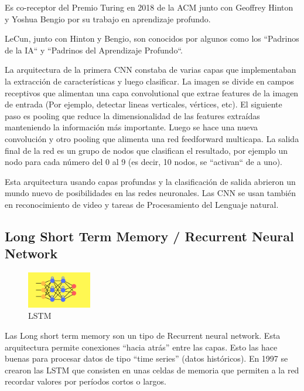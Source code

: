 \documentclass[a4paper]{article}
\begin{document}
Es co-receptor del Premio Turing en 2018 de la ACM junto con 
Geoffrey Hinton y Yoshua Bengio por su trabajo en aprendizaje 
profundo.

LeCun, junto con Hinton y Bengio, son conocidos por algunos como 
los ``Padrinos de la IA`` y ``Padrinos del Aprendizaje Profundo``. 



La arquitectura de la primera CNN constaba de varias capas que 
implementaban la extracción de características y luego clasificar. 
La imagen se divide en campos receptivos que alimentan una capa 
convolutional que extrae features de la imagen de entrada (Por 
ejemplo, detectar lineas verticales, vértices, etc). El siguiente 
paso es pooling que reduce la dimensionalidad de las features 
extraídas manteniendo la información más importante. Luego se hace 
una nueva convolución y otro pooling que alimenta una red 
feedforward multicapa. La salida final de la red es un grupo de 
nodos que clasifican el resultado, por ejemplo un nodo para cada 
número del 0 al 9 (es decir, 10 nodos, se ``activan`` de a uno).

Esta arquitectura usando capas profundas y la clasificación de 
salida abrieron un mundo nuevo de posibilidades en las redes 
neuronales. Las CNN se usan también en reconocimiento de video y 
tareas de Procesamiento del Lenguaje natural. 


\subsection{Long Short Term Memory / Recurrent Neural Network}
\begin{figure} %
    \centering
    \includegraphics[width=0.25\textwidth]{./images/net_lstm.png}
    \caption{LSTM}
\end{figure}

Las Long short term memory son un tipo de Recurrent neural 
network. Esta arquitectura permite conexiones “hacia atrás” entre 
las capas. Esto las hace buenas para procesar datos de tipo “time 
series” (datos históricos). En 1997 se crearon las LSTM que 
consisten en unas celdas de memoria que permiten a la red recordar 
valores por períodos cortos o largos.
\end{document}
